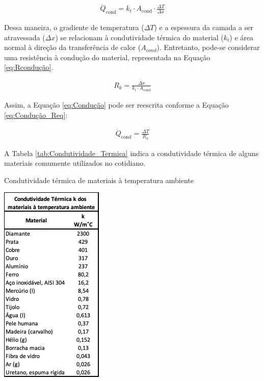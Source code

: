 \documentclass[acronym,symbols,table]{fei}
\begin{document}
\begin{equation} \label{eq:Condução}
\begin{aligned}
    \dot{Q}_{\text{cond}} = k_{t} \cdot A_{\text{cond}} \cdot \frac{\Delta T}{\Delta x}
\end{aligned}
\end{equation}

Dessa maneira, o gradiente de temperatura ($\Delta T$) e a espessura da camada a ser atravessada ($\Delta x$) se relacionam à condutividade térmica do material ($k_{t}$) e área normal à direção da transferência de calor ($A_{cond}$). Entretanto, pode-se considerar uma resistência à condução do material, representada na Equação \ref{eq:Rcondução}.

\begin{equation} \label{eq:Rcondução}
\begin{aligned}
    {R}_{k}=\frac{\Delta x}{k_{t} \cdot A_{\text{cond}}}
\end{aligned}
\end{equation}

Assim, a Equação \ref{eq:Condução} pode ser reescrita conforme a Equação \ref{eq:Condução_Req}:

\begin{equation} \label{eq:Condução_Req}
\begin{aligned}
    \dot{Q}_{\text{cond}} = \frac{\Delta T}{{R}_{k}}
\end{aligned}
\end{equation}

A Tabela \ref{tab:Condutividade_Termica} indica a condutividade térmica de alguns materiais comumente utilizados no cotidiano.

\begin{table}[!htb] 
 \centering
    \caption{Condutividade térmica de materiais à temperatura ambiente}
    \includegraphics[width=0.4\linewidth]{Tabelas/Condutividade_Termica.png}
    \label{tab:Condutividade_Termica}
\end{table}
\end{document}
